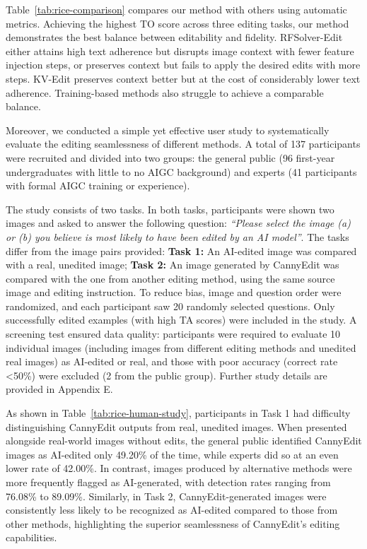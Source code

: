 \documentclass{article}
\begin{document}
Table~\ref{tab:rice-comparison} compares our method with others using automatic metrics. Achieving the highest TO score across three editing tasks, our method demonstrates the best balance between editability and fidelity. RFSolver-Edit either attains high text adherence but disrupts image context with fewer feature injection steps, or preserves context but fails to apply the desired edits with more steps. KV-Edit preserves context better but at the cost of considerably lower text adherence. Training-based methods also struggle to achieve a comparable balance.

Moreover, we conducted a simple yet effective user study to systematically evaluate the editing seamlessness of different methods. A total of 137 participants were recruited and divided into two groups: the general public (96 first-year undergraduates with little to no AIGC background) and experts (41 participants with formal AIGC training or experience).

The study consists of two tasks. In both tasks, participants were shown two images and asked to answer the following question: \emph{``Please select the image (a) or (b) you believe is most likely to have been edited by an AI model''}. The tasks differ from the image pairs provided: \textbf{Task 1:} An AI-edited image was compared with a real, unedited image; \textbf{Task 2:} An image generated by CannyEdit was compared with the one from another editing method, using the same source image and editing instruction. To reduce bias, image and question order were randomized, and each participant saw 20 randomly selected questions. Only successfully edited examples (with high TA scores) were included in the study. A screening test ensured data quality: participants were required to evaluate 10 individual images (including images from different editing methods and unedited real images) as AI-edited or real, and those with poor accuracy (correct rate <50\%) were excluded (2 from the public group). Further study details are provided in {Appendix E}.

As shown in Table~\ref{tab:rice-human-study}, participants in Task 1 had difficulty distinguishing CannyEdit outputs from real, unedited images. When presented alongside real-world images without edits, the general public identified CannyEdit images as AI-edited only 49.20\% of the time, while experts did so at an even lower rate of 42.00\%. In contrast, images produced by alternative methods were more frequently flagged as AI-generated, with detection rates ranging from 76.08\% to 89.09\%. Similarly, in Task 2, CannyEdit-generated images were consistently less likely to be recognized as AI-edited compared to those from other methods, highlighting the superior seamlessness of CannyEdit's editing capabilities.
\end{document}
